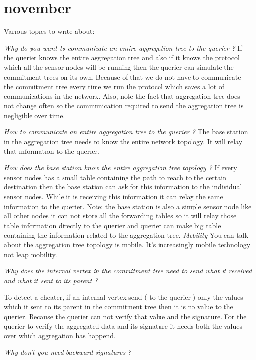 \chapter{november}

Various topics to write about:

\textit{Why do you want to communicate an entire aggregation tree to the querier ?}
	If the querier knows the entire aggregation tree and also if it knows the protocol which all the sensor nodes will be running then the querier can simulate the commitment trees on its own. Because of that we do not have to communicate the commitment tree every time we run the protocol which saves a lot of communications in the network. Also, note the fact that aggregation tree does not change often so the communication required to send the aggregation tree is negligible over time.

\textit{How to communicate an entire aggregation tree to the querier ?}
	The base station in the aggregation tree needs to know the entire network topology.
	It will relay that information to the querier.

\textit{How does the base station know the entire aggregation tree topology ?}
	If every sensor nodes has a small table containing the path to reach to the certain destination then the base station can ask for this information to the individual sensor nodes. While it is receiving this information it can relay the same information to the querier. Note: the base station is also a simple sensor node like all other nodes it can not store all the forwarding tables so it will relay those table information directly to the querier and querier can make big table containing the information related to the aggregation tree.
\textit{Mobility}
	You can talk about the aggregation tree topology is mobile. It's increasingly mobile technology not leap mobility.

\textit{Why does the internal vertex in the commitment tree need to send what it received and what it sent to its parent ?}
	
	To detect a cheater, if an internal vertex send ( to the querier ) only the values which it sent to its parent in the commitment tree then it is no value to the querier. Because the querier can not verify that value and the signature. For the querier to verify the aggregated data and its signature it needs both the values over which aggregation has happend. 

\textit{Why don't you need backward signatures ?}

